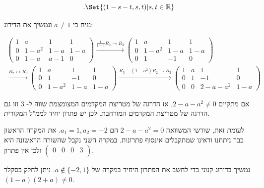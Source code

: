 \documentclass[
  hebrew,
  12pt,
  a4paper,
  oneside]{book}
\theoremstyle{definition}
\theoremstyle{remark}
\theoremstyle{plain}
\theoremstyle{remark}
\begin{document}
\begin{example}
\[.\Set{(1-s-t,s,t)|s,t\in\mathbb R}\]

נניח כי \(a\neq 1\) ונמשיך את הדירוג:

\[\begin{aligned}
\left(\begin{array}{rrr|r}
1 & a & 1 & 1 \\
0 & 1-a^2 & 1-a & 1-a\\
0 & 1-a & a-1 & 0
\end{array}\right)
\xrightarrow{\frac{1}{1-a}R_3\to R_3}
\left(\begin{array}{rrr|r}
1 & a & 1 & 1 \\
0 & 1-a^2 & 1-a & 1-a\\
0 & 1 & -1 & 0
\end{array}\right) \\
\xrightarrow{R_2\leftrightarrow R_3}
\left(\begin{array}{rrr|r}
1 & a & 1 & 1 \\
0 & 1 & -1 & 0\\
0 & 1-a^2 & 1-a & 1-a
\end{array}\right)
\xrightarrow{R_3-(1-a^2)R_2\to R_3}
\left(\begin{array}{rrr|r}
1 & a & 1 & 1 \\
0 & 1 & -1 & 0\\
0 & 0 & 2-a-a^2 & 1-a
\end{array}\right)
\end{aligned}\]

אם מתקיים \(2-a-a^2\neq 0\), אז הדרגה של מטריצת המקדמים המצומצמת שווה ל-
\(3\) וזו גם הדרגה של מטריצת המקדמים המורחבת. לכן יש פתרון יחיד לממ"ל
המקורית.

לעומת זאת, שורשי המשוואה \(2-a-a^2=0\) הם \(a_1=1, a_2=-2\). את המקרה
הראשון כבר ניתחנו וראינו שמתקבלים אינסוף פתרונות. במקרה השני נקבל שהשורה
הראשונה היא \((\begin{array}{rrr|r}
0 & 0 & 0 & 3 \\
\end{array})\) ולכן אין פתרון.

נמשיך בדירוג קנוני כדי לחשב את הפתרון היחיד במקרה של
\(a\notin\{-2,1\}\). ניתן לחלק בסקלר \((1-a)(2+a)\neq 0\).


\end{example}
\end{document}
